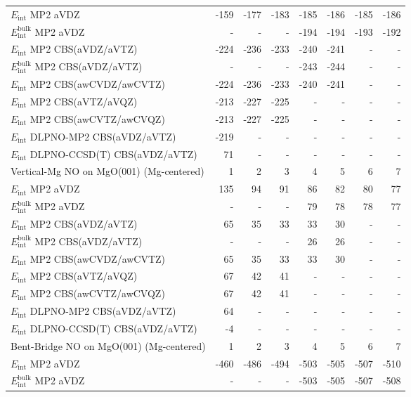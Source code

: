 \begin{longtable}{lrrrrrrr}
\midrule
$E_\textrm{int}$ MP2 aVDZ & -159 & -177 & -183 & -185 & -186 & -185 & -186 \\
$E_\textrm{int}^\textrm{bulk}$ MP2 aVDZ & - & - & - & -194 & -194 & -193 & -192 \\
$E_\textrm{int}$ MP2 CBS(aVDZ/aVTZ) & -224 & -236 & -233 & -240 & -241 & - & - \\
$E_\textrm{int}^\textrm{bulk}$ MP2 CBS(aVDZ/aVTZ) & - & - & - & -243 & -244 & - & - \\
$E_\textrm{int}$ MP2 CBS(awCVDZ/awCVTZ) & -224 & -236 & -233 & -240 & -241 & - & - \\
$E_\textrm{int}$ MP2 CBS(aVTZ/aVQZ) & -213 & -227 & -225 & - & - & - & - \\
$E_\textrm{int}$ MP2 CBS(awCVTZ/awCVQZ) & -213 & -227 & -225 & - & - & - & - \\
$E_\textrm{int}$ DLPNO-MP2 CBS(aVDZ/aVTZ) & -219 & - & - & - & - & - & - \\
$E_\textrm{int}$ DLPNO-CCSD(T) CBS(aVDZ/aVTZ) & 71 & - & - & - & - & - & - \\
\toprule
Vertical-Mg NO on MgO(001) (Mg-centered) & 1 & 2 & 3 & 4 & 5 & 6 & 7 \\ 
\midrule
$E_\textrm{int}$ MP2 aVDZ & 135 & 94 & 91 & 86 & 82 & 80 & 77 \\
$E_\textrm{int}^\textrm{bulk}$ MP2 aVDZ & - & - & - & 79 & 78 & 78 & 77 \\
$E_\textrm{int}$ MP2 CBS(aVDZ/aVTZ) & 65 & 35 & 33 & 33 & 30 & - & - \\
$E_\textrm{int}^\textrm{bulk}$ MP2 CBS(aVDZ/aVTZ) & - & - & - & 26 & 26 & - & - \\
$E_\textrm{int}$ MP2 CBS(awCVDZ/awCVTZ) & 65 & 35 & 33 & 33 & 30 & - & - \\
$E_\textrm{int}$ MP2 CBS(aVTZ/aVQZ) & 67 & 42 & 41 & - & - & - & - \\
$E_\textrm{int}$ MP2 CBS(awCVTZ/awCVQZ) & 67 & 42 & 41 & - & - & - & - \\
$E_\textrm{int}$ DLPNO-MP2 CBS(aVDZ/aVTZ) & 64 & - & - & - & - & - & - \\
$E_\textrm{int}$ DLPNO-CCSD(T) CBS(aVDZ/aVTZ) & -4 & - & - & - & - & - & - \\
\toprule
Bent-Bridge NO on MgO(001) (Mg-centered) & 1 & 2 & 3 & 4 & 5 & 6 & 7 \\ 
\midrule
$E_\textrm{int}$ MP2 aVDZ & -460 & -486 & -494 & -503 & -505 & -507 & -510 \\
$E_\textrm{int}^\textrm{bulk}$ MP2 aVDZ & - & - & - & -503 & -505 & -507 & -508 \\

\end{longtable}
